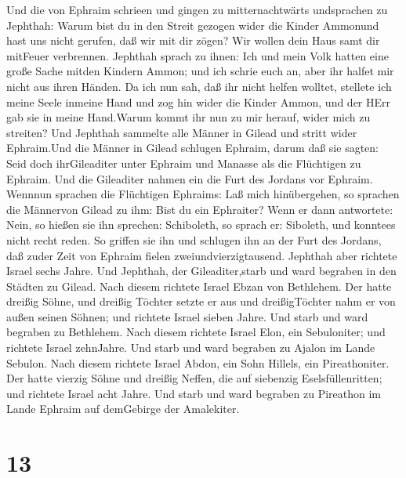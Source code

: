  Und die von Ephraim schrieen und gingen zu mitternachtwärts
undsprachen zu Jephthah: Warum bist du in den Streit gezogen wider die
Kinder Ammonund hast uns nicht gerufen, daß wir mit dir zögen? Wir
wollen dein Haus samt dir mitFeuer verbrennen.  Jephthah
sprach zu ihnen: Ich und mein Volk hatten eine große Sache mitden
Kindern Ammon; und ich schrie euch an, aber ihr halfet mir nicht aus
ihren Händen.  Da ich nun sah, daß ihr nicht helfen wolltet,
stellete ich meine Seele inmeine Hand und zog hin wider die Kinder
Ammon, und der HErr gab sie in meine Hand.Warum kommt ihr nun zu mir
herauf, wider mich zu streiten?  Und Jephthah sammelte alle
Männer in Gilead und stritt wider Ephraim.Und die Männer in Gilead
schlugen Ephraim, darum daß sie sagten: Seid doch ihrGileaditer unter
Ephraim und Manasse als die Flüchtigen zu Ephraim.  Und die
Gileaditer nahmen ein die Furt des Jordans vor Ephraim. Wennnun sprachen
die Flüchtigen Ephraims: Laß mich hinübergehen, so sprachen die
Männervon Gilead zu ihm: Bist du ein Ephraiter? Wenn er dann antwortete:
Nein,  so hießen sie ihn sprechen: Schiboleth, so sprach er:
Siboleth, und konntees nicht recht reden. So griffen sie ihn und
schlugen ihn an der Furt des Jordans, daß zuder Zeit von Ephraim fielen
zweiundvierzigtausend.  Jephthah aber richtete Israel sechs
Jahre. Und Jephthah, der Gileaditer,starb und ward begraben in den
Städten zu Gilead.  Nach diesem richtete Israel Ebzan von
Bethlehem.  Der hatte dreißig Söhne, und dreißig Töchter
setzte er aus und dreißigTöchter nahm er von außen seinen Söhnen; und
richtete Israel sieben Jahre.  Und starb und ward begraben
zu Bethlehem.  Nach diesem richtete Israel Elon, ein
Sebuloniter; und richtete Israel zehnJahre.  Und starb und
ward begraben zu Ajalon im Lande Sebulon.  Nach diesem
richtete Israel Abdon, ein Sohn Hillels, ein Pireathoniter.
 Der hatte vierzig Söhne und dreißig Neffen, die auf
siebenzig Eselsfüllenritten; und richtete Israel acht Jahre.
 Und starb und ward begraben zu Pireathon im Lande Ephraim
auf demGebirge der Amalekiter.

\hypertarget{section-12}{%
\section{13}\label{section-12}}

